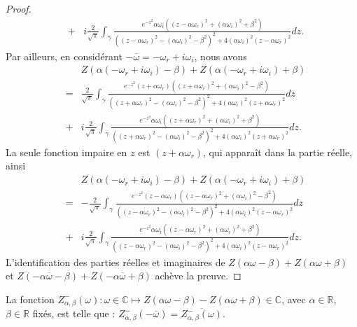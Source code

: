 \begin{proof}
\begin{eqnarray*}
    &+&i\frac{2}{\sqrt{\pi}}\int_\gamma\frac{e^{-z^2}\alpha\omega_i\left((z-\alpha\omega_r)^2+(\alpha\omega_i)^2+\beta^2\right)}{\left((z-\alpha\omega_r)^2-(\alpha\omega_i)^2-\beta^2\right)^2+4\left(\alpha\omega_i\right)^2(z-\alpha\omega_r)^2}dz.
  \end{eqnarray*}
  Par ailleurs, en considérant $-\overline{\omega}=-\omega_r+i\omega_i$, nous avons
  \begin{eqnarray*}
    &&Z(\alpha(-\omega_r+i\omega_i)-\beta)+Z(\alpha(-\omega_r+i\omega_i)+\beta)\\
    &=&\frac{2}{\sqrt{\pi}}\int_\gamma\frac{e^{-z^2}(z+\alpha\omega_r)\left((z+\alpha\omega_r)^2+(\alpha\omega_i)^2-\beta^2\right)}{\left((z+\alpha\omega_r)^2-(\alpha\omega_i)^2-\beta^2\right)^2+4\left(\alpha\omega_i\right)^2(z+\alpha\omega_r)^2}dz\\
    &+&i\frac{2}{\sqrt{\pi}}\int_\gamma\frac{e^{-z^2}\alpha\omega_i\left((z+\alpha\omega_r)^2+(\alpha\omega_i)^2+\beta^2\right)}{\left((z+\alpha\omega_r)^2-(\alpha\omega_i)^2-\beta^2\right)^2+4\left(\alpha\omega_i\right)^2(z+\alpha\omega_r)^2}dz.
  \end{eqnarray*}
  La seule fonction impaire en $z$ est $(z+\alpha\omega_r)$, qui apparaît dans la partie réelle, ainsi
  \begin{eqnarray*}
    &&Z(\alpha(-\omega_r+i\omega_i)-\beta)+Z(\alpha(-\omega_r+i\omega_i)+\beta)\\
    &=&-\frac{2}{\sqrt{\pi}}\int_\gamma\frac{e^{-z^2}(z-\alpha\omega_r)\left((z-\alpha\omega_r)^2+(\alpha\omega_i)^2-\beta^2\right)}{\left((z-\alpha\omega_r)^2-(\alpha\omega_i)^2-\beta^2\right)^2+4\left(\alpha\omega_i\right)^2(z-\alpha\omega_r)^2}dz\\
    &+&i\frac{2}{\sqrt{\pi}}\int_\gamma\frac{e^{-z^2}\alpha\omega_i\left((z-\alpha\omega_r)^2+(\alpha\omega_i)^2+\beta^2\right)}{\left((z-\alpha\omega_r)^2-(\alpha\omega_i)^2-\beta^2\right)^2+4\left(\alpha\omega_i\right)^2(z-\alpha\omega_r)^2}dz.
  \end{eqnarray*}
  L'identification des parties réelles et imaginaires de $Z(\alpha\omega-\beta)+Z(\alpha\omega+\beta)$ et $Z(-\alpha\overline{\omega}-\beta)+Z(-\alpha\overline{\omega}+\beta)$ achève la preuve.
\end{proof}


\begin{lemma}
  La fonction $Z_{\alpha,\beta}^-(\omega):\omega\in\mathbb{C}\mapsto Z\left(\alpha\omega-\beta\right)-Z\left(\alpha\omega+\beta\right)\in\mathbb{C}$, avec $\alpha\in\mathbb{R}$, $\beta\in\mathbb{R}$ fixés, est telle que : $Z_{\alpha,\beta}^-\left(-\overline{\omega}\right)=\overline{Z_{\alpha,\beta}^-(\omega)}$.
\end{lemma}

